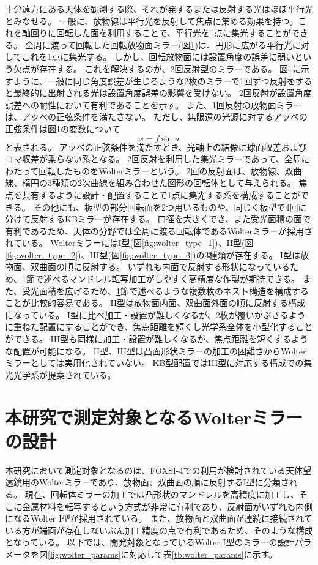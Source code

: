 十分遠方にある天体を観測する際、それが発するまたは反射する光はほぼ平行光とみなせる。
一般に、放物線は平行光を反射して焦点に集める効果を持つ。これを軸回りに回転した面を利用することで、平行光を1点に集光することができる。
全周に渡って回転した回転放物面ミラー(図\ref{})は、円形に広がる平行光に対してこれを1点に集光する。
しかし、回転放物面には設置角度の誤差に弱いという欠点が存在する。
これを解決するのが、2回反射型のミラーである。
図\ref{}に示すように、一般に同じ角度誤差が生じるような2枚のミラーで1回ずつ反射をすると最終的に出射される光は設置角度誤差の影響を受けない。
2回反射が設置角度誤差への耐性において有利であることを示す。
また、1回反射の放物面ミラーは、アッベの正弦条件を満たさない。
ただし、無限遠の光源に対するアッベの正弦条件は図\ref{}の変数について
\[
    x = f \sin u
\]
と表される。
アッベの正弦条件を満たすとき、光軸上の結像に球面収差およびコマ収差が乗らない系となる。
2回反射を利用した集光ミラーであって、全周にわたって回転したものをWolterミラーという。
2回の反射面は、放物線、双曲線、楕円の3種類の2次曲線を組み合わせた図形の回転体として与えられる。
焦点を共有するように設計・配置することで1点に集光する系を構成することができる。
その他にも、板型の部分回転面を2つ用いるものや、同じく板型で4回に分けて反射するKBミラーが存在する。
口径を大きくでき、また受光面積の面で有利であるため、天体の分野では全周に渡る回転体であるWolterミラーが採用されている。
WolterミラーにはI型(図\ref{fig:wolter_type_1})、II型(図\ref{fig:wolter_type_2})、III型(図\ref{fig:wolter_type_3})の3種類が存在する。
I型は放物面、双曲面の順に反射する。
いずれも内面で反射する形状になっているため、\ref{}節で述べるマンドレル転写加工がしやすく高精度な作製が期待できる。
また、受光面積を広げるため、\ref{}節で述べるような複数枚のネスト構造を構成することが比較的容易である。
II型は放物面内面、双曲面外面の順に反射する構成になっている。
I型に比べ加工・設置が難しくなるが、2枚が覆いかぶさるように重ねた配置にすることができ、焦点距離を短くし光学系全体を小型化することができる。
III型も同様に加工・設置が難しくなるが、焦点距離を短くするような配置が可能になる。
II型、III型は凸面形状ミラーの加工の困難さからWolterミラーとしては実用化されていない。
KB型配置ではIII型に対応する構成での集光光学系が提案されている。\cite{Yamada:20}

\clearpage
\newpage

\section{本研究で測定対象となるWolterミラーの設計}
本研究において測定対象となるのは、FOXSI-4での利用が検討されている天体望遠鏡用のWolterミラーであり、放物面、双曲面の順に反射するI型に分類される。
現在、回転体ミラーの加工では凸形状のマンドレルを高精度に加工し、そこに金属材料を転写するという方式が非常に有利であり、反射面がいずれも内側になるWolter I型が採用されている。
また、放物面と双曲面が連続に接続されている方が端面が存在しないぶん加工精度の点で有利であるため、そのような構成となっている。
以下では、開発対象となっているWolter I型のミラーの設計パラメータを図\ref{fig:wolter_params}に対応して表\ref{tb:wolter_params}に示す。

